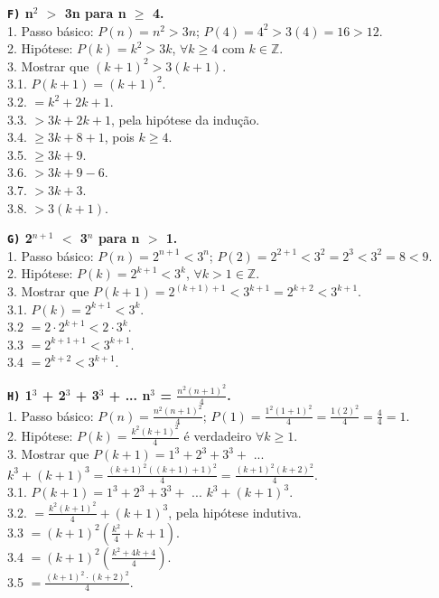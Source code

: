 \documentclass[12pt, a4paper]{article}
\newcommand{\Z}{\mathbb{Z}}
\newcommand\tab[1][1cm]{\hspace*{#1}}
\begin{document}
\begin{flushleft}
\vskip10mm

\textbf{\textbf{\texttt{F)}} n$^{2}$ $>$ 3n para n $\geq$ 4.\\}
\textsf{1. Passo básico: $P(n) = n^2 > 3n$; $P(4) = 4^2 > 3(4) = 16 > 12$.
\\2. Hipótese: $P(k) = k^2 > 3k$, $ \forall k \geq 4 $ com $k \in \Z$.
\\3. Mostrar que $(k+1)^2 > \boxed{3(k+1)}$.
\\3.1. $P(k+1) = (k+1)^2$.
\\3.2.\tab \tab[0.75cm] $=k^2 + 2k + 1 $.
\\3.3.\tab \tab[0.75cm] $> 3k+2k+1 $, pela hipótese da indução.
\\3.4.\tab \tab[0.75cm] $\geq 3k+8+1 $, pois $k \geq 4$.
\\3.5.\tab \tab[0.75cm] $\geq 3k+9 $.
\\3.6.\tab \tab[0.75cm] $> 3k+9-6 $.
\\3.7.\tab \tab[0.75cm] $> 3k+3 $.
\\3.8.\tab \tab[0.75cm] $> \boxed{3(k+1) }$.}

\pagebreak

\textbf{\textbf{\texttt{G)}} 2$^{n+1}$ $<$ 3$^n$ para n $>$ 1.\\}
\textsf{1. Passo básico: $P(n) = 2^{n+1} < 3^n$; $P(2) = 2^{2+1} < 3^2 = 2^3 < 3^2 = 8 < 9$.
\\2. Hipótese: $P(k) = 2^{k+1} < 3^k$, $\forall k > 1 \in \Z$.
\\3. Mostrar que $P(k+1) = 2^{(k+1)+1} < 3^{k+1} = \boxed{2^{k+2} < 3^{k+1}}$.
\\3.1. $P(k) = 2^{k+1} < 3^k$.
\\3.2 \tab[1.05cm] $= 2 \cdot 2^{k+1} < 2 \cdot 3^k $.
\\3.3 \tab[1.05cm] $= 2^{k+1+1} < 3^{k+1} $.
\\3.4 \tab[1.05cm] $= \boxed{2^{k+2} < 3^{k+1}} $.}

\vskip10mm

\textbf{\textbf{\texttt{H)}} 1$^3$ + 2$^3$ + 3$^3$ + ... n$^3$ = $\frac{n^2(n+1)^2}{4}$.\\}
\textsf{1. Passo básico: $P(n) = \frac{n^2(n+1)^2}{4}$; $P(1) = \frac{1^2(1+1)^2}{4} = \frac{1(2)^2}{4} = \frac{4}{4} = 1 $.
\\2. Hipótese: $P(k) = \frac{k^2(k+1)^2}{4}$ é verdadeiro $\forall k \geq 1$.
\\3. Mostrar que $P(k+1) = 1^3 + 2^3 + 3^3 +$ ... $k^3 + (k+1)^3 = \frac{(k+1)^2((k+1)+1)^2}{4} = \frac{(k+1)^2(k+2)^2}{4}$.
\\3.1. $P(k+1) = 1^3 + 2^3 + 3^3 +$ ... $k^3 + (k+1)^3$.
\\3.2.\tab \tab[0.76cm] $=\frac{k^2(k+1)^2}{4}+ (k+1)^3$, pela hipótese indutiva.
\\3.3 \tab \tab[0.76cm] $= (k+1)^2(\frac{k^2}{4} + k + 1)$.
\\3.4 \tab \tab[0.76cm] $= (k+1)^2(\frac{k^2+4k+4}{4})$.
\\3.5 \tab \tab[0.76cm] $= \boxed{\frac{(k+1)^2 \cdot (k+2)^2}{4}}$.}



\end{flushleft}
\end{document}
